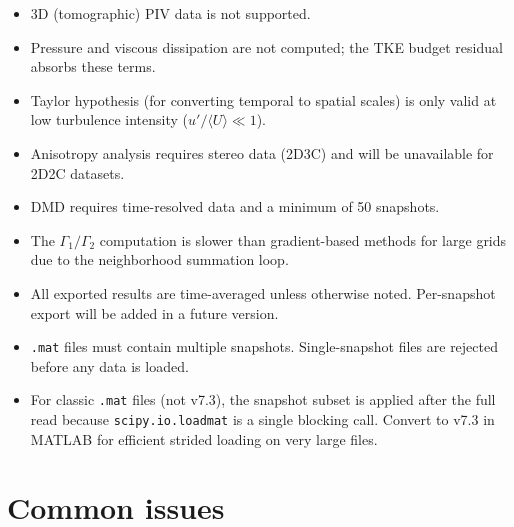 \begin{itemize}[leftmargin=1.5em]
  \item 3D (tomographic) PIV data is not supported.
  \item Pressure and viscous dissipation are not computed; the TKE budget residual absorbs these terms.
  \item Taylor hypothesis (for converting temporal to spatial scales) is only valid at low turbulence intensity ($u'/\langle U\rangle \ll 1$).
  \item Anisotropy analysis requires stereo data (2D3C) and will be unavailable for 2D2C datasets.
  \item DMD requires time-resolved data and a minimum of 50 snapshots.
  \item The $\Gamma_1/\Gamma_2$ computation is slower than gradient-based methods for large grids due to the neighborhood summation loop.
  \item All exported results are time-averaged unless otherwise noted. Per-snapshot export will be added in a future version.
  \item \texttt{.mat} files must contain multiple snapshots. Single-snapshot files are rejected before any data is loaded.
  \item For classic \texttt{.mat} files (not v7.3), the snapshot subset is applied after the full read because \texttt{scipy.io.loadmat} is a single blocking call. Convert to v7.3 in MATLAB for efficient strided loading on very large files.
\end{itemize}

\section{Common issues}


